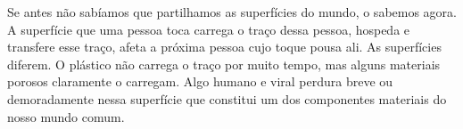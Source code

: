 \vfill

\hspace*{-.4cm}\begin{minipage}[c]{1\linewidth}
\small{
{}}
\end{minipage}

\pagebreak

\vspace*{1.5cm}


\bigskip

\hfill{}

\bigskip
\bigskip
\bigskip

Se antes não sabíamos que partilhamos as superfícies do mundo, o sabemos
agora. A superfície que uma pessoa toca carrega o traço dessa pessoa,
hospeda e transfere esse traço, afeta a próxima pessoa cujo toque pousa
ali. As superfícies diferem. O plástico não carrega o traço por muito
tempo, mas alguns materiais porosos claramente o carregam. Algo humano e
viral perdura breve ou demoradamente nessa superfície que constitui um
dos componentes materiais do nosso mundo comum.

